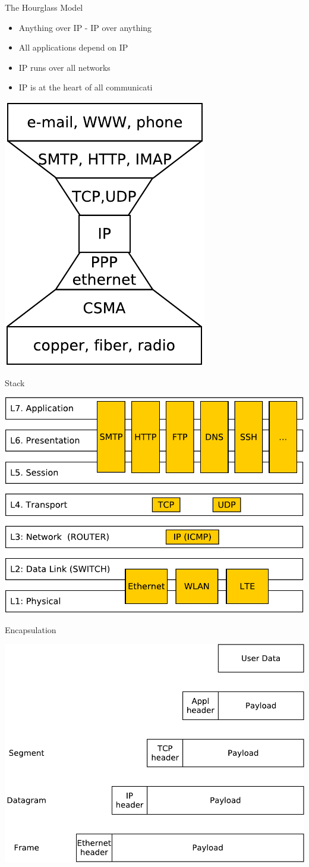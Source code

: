 \documentclass{beamer}
\begin{document}
\begin{frame}{The Hourglass Model}
  \begin{itemize}
    \item Anything over IP - IP over anything
    \item All applications depend on IP
    \item IP runs over all networks
    \item IP is at the heart of all communicati
  \end{itemize}
  \begin{center}
    \includegraphics[width=0.4\linewidth]{net2}
  \end{center}
\end{frame}

\begin{frame}{Stack}
  \begin{center}
    \includegraphics[width=0.6\linewidth]{stack}
  \end{center}
\end{frame}

\begin{frame}{Encapsulation}
  \begin{center}
    \includegraphics[width=0.7\linewidth]{encapsulation}
  \end{center}
\end{frame}
\end{document}

